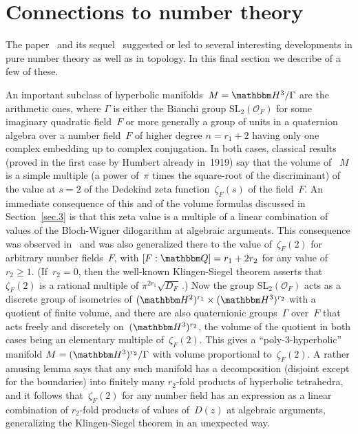 \documentclass[12pt,reqno]{amsart}
\theoremstyle{definition}
\def\BQ{\mathbbm Q}
\def\BH{\mathbbm H}
\def\calO{\mathcal O}
\def\G{\Gamma}
\def\SL{\mathrm{SL}}
\def\z{\zeta}
\begin{document}

\section{Connections to number theory}
\label{sec.7}

The paper~\cite{NZ} and its sequel~\cite{N:combinatorics} suggested or led to
several interesting developments in pure number theory as well as in topology.
In this final section we describe of a few of these.

\bigskip


\smallskip\noindent
An important subclass of hyperbolic manifolds~$M=\BH^3/\G$ are the arithmetic ones, 
where $\G$ is either the Bianchi group $\SL_2(\calO_F)$ for some imaginary quadratic 
field~$F$ or more generally a group of units in a quaternion
algebra over a number field~$F$ of higher degree $n=r_1+2$ having only
one complex embedding up to complex conjugation.  In both cases,
classical results (proved in the first case by Humbert already in~1919) say
that the volume of ~$M$ is a simple multiple (a power of~$\pi$ times the
square-root of the discriminant) of the value at $s=2$ of the Dedekind zeta
function~$\z_F(s)$ of the field~$F$.  An immediate consequence of this and
of the volume formulas discussed in Section~\ref{sec.3} is that this zeta value
is a multiple of a linear combination of values of the Bloch-Wigner dilogarithm
at algebraic arguments.  This consequence was observed in~\cite{Z:hyperbolic}
and was also generalized there to the value of~$\z_F(2)$ for arbitrary number fields~$F$, 
with $[F:\BQ]=r_1+2r_2$ for any value of~$r_2\ge1$.  (If~$r_2=0$, then the well-known 
Klingen-Siegel theorem asserts that $\z_F(2)$ is a rational multiple of
$\pi^{2r_1}\sqrt{D_F}\,$.) Now the group $\SL_2(\calO_F)$ acts as a discrete group of
isometries of $(\BH^2)^{r_1}\times(\BH^3)^{r_2}$ with a quotient of finite volume, and
there are also quaternionic groups~$\G$ over~$F$ that acts freely and discretely
on~$(\BH^3)^{r_2}$, the volume of the quotient in both cases being an elementary
multiple of~$\z_F(2)$. This gives a ``poly-3-hyperbolic'' manifold $M=(\BH^3)^{r_2}/\G$
with volume proportional to~$\z_F(2)$.  A rather amusing lemma says that any such
manifold has a decomposition (disjoint except for the boundaries) into finitely many
$r_2$-fold products of hyperbolic tetrahedra, and it follows that~$\z_F(2)$  for any
number field has an expression as a linear combination of $r_2$-fold products of
values of~$D(z)$ at algebraic arguments, generalizing the Klingen-Siegel theorem
in an unexpected way. 
\end{document}
